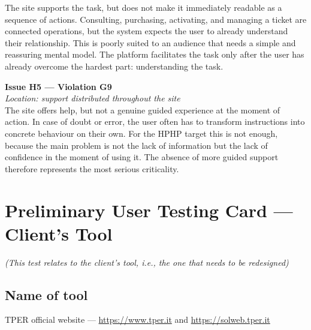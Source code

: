 ﻿\documentclass[11pt,a4paper]{article}
\begin{document}
\noindent The site supports the task, but does not make it immediately readable as a sequence of actions. Consulting, purchasing, activating, and managing a ticket are connected operations, but the system expects the user to already understand their relationship. This is poorly suited to an audience that needs a simple and reassuring mental model. The platform facilitates the task only after the user has already overcome the hardest part: understanding the task.

\bigskip

\noindent\textbf{Issue H5 --- Violation G9}\label{atac:H5}\\
\textit{Location: support distributed throughout the site}\\

\noindent The site offers help, but not a genuine guided experience at the moment of action. In case of doubt or error, the user often has to transform instructions into concrete behaviour on their own. For the HPHP target this is not enough, because the main problem is not the lack of information but the lack of confidence in the moment of using it. The absence of more guided support therefore represents the most serious criticality.

\newpage



\newpage

\section{Preliminary User Testing Card --- Client's Tool}
\textit{(This test relates to the client's tool, i.e., the one that needs to be redesigned)}

\vspace{0.2cm}

\subsection*{Name of tool}
\begin{tcolorbox}[base]
TPER official website --- \url{https://www.tper.it} and \url{https://solweb.tper.it}
\end{tcolorbox}
\end{document}
